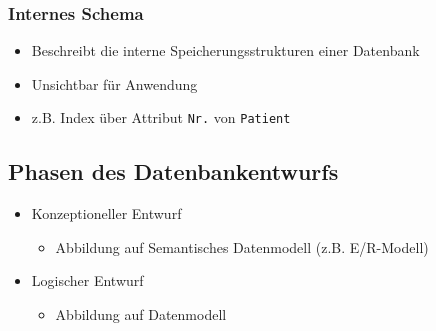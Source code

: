 \subsubsection{Internes Schema}
\begin{itemize}
	\item Beschreibt die interne Speicherungsstrukturen einer Datenbank
	\item Unsichtbar für Anwendung
	\item z.B. Index über Attribut \verb|Nr.| von \verb|Patient|
\end{itemize}

\subsection{Phasen des Datenbankentwurfs}
\begin{itemize}
	\item Konzeptioneller Entwurf
		\begin{itemize}
			\item Abbildung auf Semantisches Datenmodell (z.B. E/R-Modell)
		\end{itemize}
	\item Logischer Entwurf
		\begin{itemize}
			\item Abbildung auf Datenmodell
		\end{itemize}
\end{itemize}
















